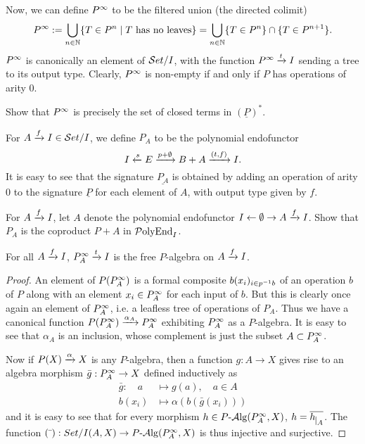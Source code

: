 Now, we can define $P^{\moo}$ to be the filtered union (the directed colimit)
\[
    P^\moo := \bigcup_{n\in\NN} \{ T\in P^n \ssep T \text{ has no leaves} \} =
    \bigcup_{n\in\NN} \{ T\in P^n \} \cap \{ T \in P^{n+1} \}.
\]
$P^\moo$ is canonically an element of $\Set/I$, with the function
$P^\moo\xto{t}I$ sending a tree to its output type. Clearly, $P^\moo$ is
non-empty if and only if $P$ has operations of arity $0$.

\begin{exercise}
    Show that $P^\moo$ is precisely the set of closed terms in $(\underline{P})^*$.
\end{exercise}

For $A\xto{f} I \in \Set/I$, we define $P_A$ to be the polynomial endofunctor
\[
    I\xot{s} E\xto{p+\emptyset} B+A \xto{(t,f)} I.
\]
It is easy to see that the signature $\underline{P_A}$ is obtained by adding an
operation of arity $0$ to the signature $\underline{P}$ for each element of $A$,
with output type given by $f$.

\begin{exercise}
    For $A\xto{f} I$, let $A$ denote the polynomial endofunctor
    $I\ot\emptyset\to A\xto{f} I$. Show that $P_A$ is the coproduct $P+A$ in
    $\PolyEnd_I$.
\end{exercise}

\begin{lemma} \label{lemma:free-algebra}
    For all $A\xto{f}I$, $P_A^\moo\xto{t}I$ is the free $P$-algebra on
    $A\xto{f}I$.
\end{lemma}
\begin{proof}
    An element of $P(P_A^\moo)$ is a formal composite $b(x_i)_{i\in p\inv b}$ of
    an operation $b$ of $P$ along with an element $x_i\in P_A^\moo$ for each
    input of $b$. But this is clearly once again an element of $P_A^\moo$, i.e.
    a leafless tree of operations of $P_A$. Thus we have a canonical function
    $P(P_A^\moo)\xto{\alpha_A} P_A^\moo$ exhibiting $P_A^\moo$ as a $P$-algebra.
    It is easy to see that $\alpha_A$ is an inclusion, whose complement is just
    the subset $A\subset P_A^\moo$.

    Now if $P(X)\xto{\alpha} X$ is any $P$-algebra, then a function $g:A\to X$
    gives rise to an algebra morphism $\bar{g}:P_A^\moo\to X$ defined
    inductively as
    \begin{align*}
      \bar{g} :  \quad a &\mapsto g(a),\quad a\in A \\
      b(x_i) &\mapsto \alpha(b(\bar{g}(x_i)))
    \end{align*}
    and it is easy to see that for every morphism $h\in P\alg(P_A^\moo,X)$,
    $h=\overline{h\restr A}$. The function $(\bar{\ }):Set/I(A,X)\to
    P\alg(P_A^\moo,X)$ is thus injective and surjective.
\end{proof}

